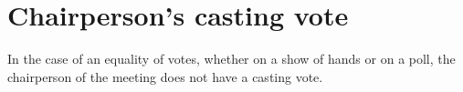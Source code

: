 \section{Chairperson's casting vote}

In the case of an equality of votes, whether on a show of hands or on a poll, the chairperson of the meeting does not have a casting vote. 